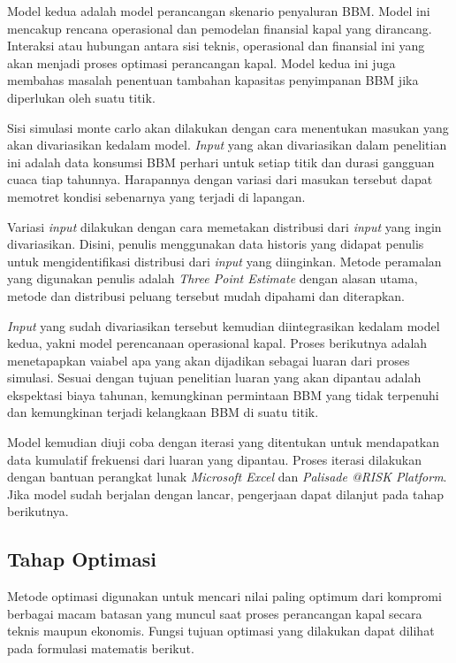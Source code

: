     Model kedua adalah model perancangan skenario penyaluran BBM. Model ini mencakup rencana operasional dan pemodelan finansial kapal yang dirancang. Interaksi atau hubungan antara sisi teknis, operasional dan finansial ini yang akan menjadi proses optimasi perancangan kapal. Model kedua ini juga membahas masalah penentuan tambahan kapasitas penyimpanan BBM jika diperlukan oleh suatu titik.

    Sisi simulasi monte carlo akan dilakukan dengan cara menentukan masukan yang akan divariasikan kedalam model. \emph{Input} yang akan divariasikan dalam penelitian ini adalah data konsumsi BBM perhari untuk setiap titik dan durasi gangguan cuaca tiap tahunnya. Harapannya dengan variasi dari masukan tersebut dapat memotret kondisi sebenarnya yang terjadi di lapangan.

    Variasi \emph{input} dilakukan dengan cara memetakan distribusi dari \emph{input} yang ingin divariasikan. Disini, penulis menggunakan data historis yang didapat penulis untuk mengidentifikasi distribusi dari \emph{input} yang diinginkan. Metode peramalan yang digunakan penulis adalah \emph{Three Point Estimate} dengan alasan utama, metode dan distribusi peluang tersebut mudah dipahami dan diterapkan.

    \emph{Input} yang sudah divariasikan tersebut kemudian diintegrasikan kedalam model kedua, yakni model perencanaan operasional kapal. Proses berikutnya adalah menetapapkan vaiabel apa yang akan dijadikan sebagai luaran dari proses simulasi. Sesuai dengan tujuan penelitian luaran yang akan dipantau adalah ekspektasi biaya tahunan, kemungkinan permintaan BBM yang tidak terpenuhi dan kemungkinan terjadi kelangkaan BBM di suatu titik.

    Model kemudian diuji coba dengan iterasi yang ditentukan untuk mendapatkan data kumulatif frekuensi dari luaran yang dipantau. Proses iterasi dilakukan dengan bantuan perangkat lunak \emph{Microsoft Excel} dan \emph{Palisade @RISK Platform}. Jika model sudah berjalan dengan lancar, pengerjaan dapat dilanjut pada tahap berikutnya.

\subsection{Tahap Optimasi}
\label{subsec:tahap-optimasi}

    Metode optimasi digunakan untuk mencari nilai paling optimum dari kompromi berbagai macam batasan yang muncul saat proses perancangan kapal secara teknis maupun ekonomis. Fungsi tujuan optimasi yang dilakukan dapat dilihat pada formulasi matematis berikut.

